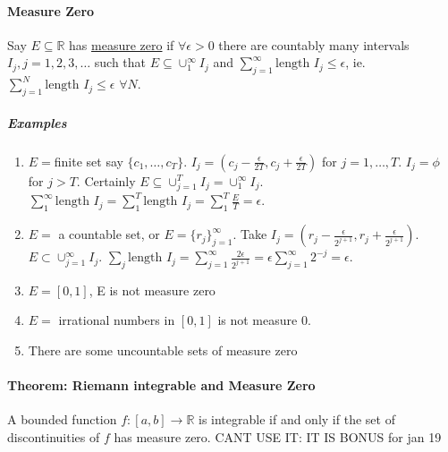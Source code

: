 \documentclass[10pt,letter]{article}
\begin{document}
\paragraph{Measure Zero}
Say $E\subseteq\mathbb{R}$ has \underline{measure zero} if $\forall\epsilon>0$ there are countably many intervals $I_j,j=1,2,3,\ldots$ such that $E\subseteq\cup_1^\infty I_j$ and $\sum_{j=1}^\infty\text{length }I_j\leq\epsilon$, ie. $\sum_{j=1}^N\text{length }I_j\leq\epsilon$ $\forall N$. 
\subparagraph{Examples}
\begin{enumerate}
    \item $E=$finite set say $\{c_1,\ldots,c_T\}$. $I_j=(c_j-\frac{\epsilon}{2T},c_j+\frac{\epsilon}{2T})$ for $j=1,\ldots,T$. $I_j=\phi$ for $j>T$. Certainly $E\subseteq\cup_{j=1}^TI_j=\cup_1^\infty I_j$. $\sum_1^\infty\text{length }I_j=\sum_{1}^T\text{length }I_j=\sum_1^T\frac{E}{T}=\epsilon$.
    \item $E=$ a countable set, or $E=\{r_j\}_{j=1}^\infty$. Take $I_j=(r_j-\frac{\epsilon}{2^{j+1}},r_j+\frac{\epsilon}{2^{j+1}})$. $E\subset\cup_{j=1}^\infty I_j$. $\sum_j\text{length }I_j=\sum_{j=1}^\infty\frac{2\epsilon}{2^{j+1}}=\epsilon\sum_{j=1}^\infty 2^{-j}=\epsilon$. 
    \item $E=[0,1]$, E is not measure zero
    \item $E=$ irrational numbers in $[0,1]$ is not measure 0.
    \item There are some uncountable sets of measure zero 
\end{enumerate}

\paragraph{Theorem: Riemann integrable and Measure Zero}
A bounded function $f:[a,b]\rightarrow\mathbb{R}$ is integrable if and only if the set of discontinuities of $f$ has measure zero. CANT USE IT: IT IS BONUS for jan 19
\end{document}
